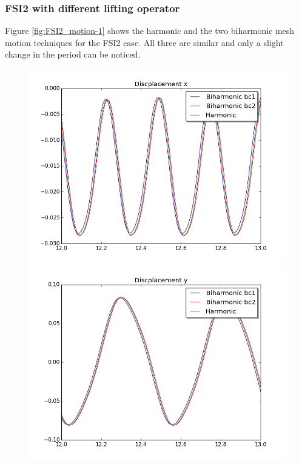 \subsubsection{FSI2 with different lifting operator}

Figure \ref{fig:FSI2_motion-1} shows the harmonic and the two biharmonic mesh motion techniques for the FSI2 case. All three are similar and only a slight change in the period can be noticed.
 
\begin{figure}[H]  
  \begin{minipage}[b]{0.6\linewidth}
    \centering
    \includegraphics[scale=0.40]{./Mesh_motion_results/FSI2_dt001_dis_x.png} 
    \vspace{4ex}
  \end{minipage}%
  \begin{minipage}[b]{0.6\linewidth}
    \centering
    \includegraphics[scale=0.40]{./Mesh_motion_results/FSI2_dt001_dis_y.png} 

\end{minipage}
\end{figure}
